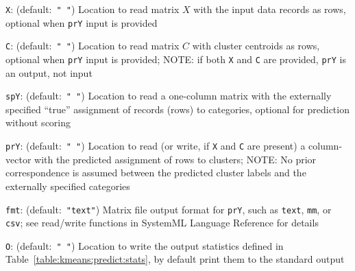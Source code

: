 \begin{Description}
\item[{\tt X}:] (default:\mbox{ }{\tt " "})
Location to read matrix $X$ with the input data records as rows,
optional when {\tt prY} input is provided
\item[{\tt C}:] (default:\mbox{ }{\tt " "})
Location to read matrix $C$ with cluster centroids as rows, optional
when {\tt prY} input is provided; NOTE: if both {\tt X} and {\tt C} are
provided, {\tt prY} is an output, not input
\item[{\tt spY}:] (default:\mbox{ }{\tt " "})
Location to read a one-column matrix with the externally specified ``true''
assignment of records (rows) to categories, optional for prediction without
scoring
\item[{\tt prY}:] (default:\mbox{ }{\tt " "})
Location to read (or write, if {\tt X} and {\tt C} are present) a
column-vector with the predicted assignment of rows to clusters;
NOTE: No prior correspondence is assumed between the predicted
cluster labels and the externally specified categories
\item[{\tt fmt}:] (default:\mbox{ }{\tt "text"})
Matrix file output format for {\tt prY}, such as {\tt text}, {\tt mm},
or {\tt csv}; see read/write functions in SystemML Language Reference
for details
\item[{\tt O}:] (default:\mbox{ }{\tt " "})
Location to write the output statistics defined in 
Table~\ref{table:kmeans:predict:stats}, by default print them to the
standard output
\end{Description}


